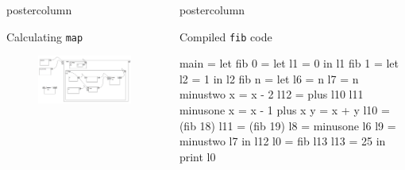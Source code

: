 \documentclass[final]{beamer}
\begin{document}
\begin{frame}[fragile]
\begin{columns}[T]
\begin{column}{.35\textwidth}
\begin{beamercolorbox}[wd=\textwidth]{postercolumn}
\begin{block}{Calculating \texttt{map}}
\begin{figure}
                        \includegraphics[width=1\textwidth]{map-diagram.pdf}
                    \end{figure}
                \end{block}
            \end{beamercolorbox}
        \end{column}

        \begin{column}{.31\textwidth}
            \begin{beamercolorbox}[wd=\textwidth]{postercolumn}
                \begin{block}{Compiled \texttt{fib} code}
                    \begin{code}
main = let fib 0 = let l1 = 0
                    in l1
            fib 1 = let l2 = 1
                    in l2
            fib n = let l6 = n
                        l7 = n
                        minustwo x = x - 2
                        l12 = plus l10 l11
                        minusone x = x - 1
                        plus x y = x + y
                        l10 = (fib 18)
                        l11 = (fib 19)
                        l8 = minusone l6
                        l9 = minustwo l7
                    in l12
            l0 = fib l13
            l13 = 25
        in print l0
                    \end{code}
                \end{block}


\end{beamercolorbox}
\end{column}
\end{columns}
\end{frame}
\end{document}
